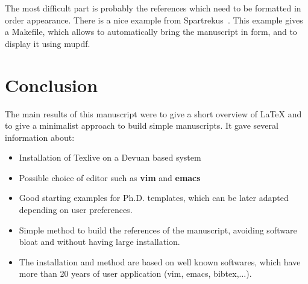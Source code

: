\documentclass[11pt]{article}
\newcommand{\mbf}[1]{{\bfseries #1}}
\begin{document}
The most difficult part is probably the references which need to be 
formatted in order appearance. 
There is a nice example from Spartrekus~\cite{spartrekus2324897}.
This example gives a Makefile, which allows to automatically bring
the manuscript in form, and to display it using mupdf. 


\section{Conclusion}
The main results of this manuscript were to give a short overview of \LaTeX
and to give a minimalist approach to build simple manuscripts.
It gave several information about:
\begin{itemize}
\item Installation of Texlive on a Devuan based system
\item Possible choice of editor such as \mbf{vim} and \mbf{emacs}
\item Good starting examples for Ph.D. templates, which can be later adapted depending on user preferences.
\item Simple method to build the references of the manuscript, avoiding software bloat and without having large installation.
\item The installation and method are based on well known softwares, which have more than 20 years of user application (vim, emacs, bibtex,...).
\end{itemize}

{}
%

\end{document}
